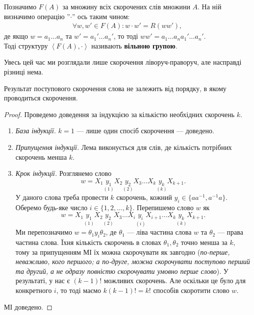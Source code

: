 \documentclass{math_library}
\begin{document}
\begin{definition}
Позначимо $F(A)$ за множину всіх скорочених слів множини $A$. На ній визначимо операцію ''$\cdot$'' ось таким чином:
\begin{align*}
\forall w,w' \in F(A): w \cdot w' = R(ww'),
\end{align*}
де якщо $w = a_1 \dots a_n$ та $w' = a_1' \dots a_n'$, то тоді $ww' = a_1 \dots a_n a_1' \dots a_n'$.\\
Тоді структуру $\left< F(A), \cdot \right>$ називають \textbf{вільною групою}.
\end{definition}

Увесь цей час ми розглядали лише скорочення ліворуч-праворуч, але насправді різниці нема.

\begin{lemma}
Результат поступового скорочення слова не залежить від порядку, в якому проводиться скорочення.
\end{lemma}

\begin{proof}
Проведемо доведення за індукцією за кількістю необхідних скорочень $k$.
\begin{enumerate}[nosep,wide=0pt,label={\Roman*.}]
\item \textit{База індукції.} $k = 1$ --- лише один спосіб скорочення --- доведено.
\item \textit{Припущення індукції.} Лема виконується для слів, де кількість потрібних скорочень менша $k$.
\item \textit{Крок індукції.} Розглянемо слово
\[ 
w = X_1 \underset{(1)}{y_1} X_2 \underset{(2)}{y_2} X_3 \dots X_{k} \underset{(k)}{y_k} X_{k+1}.
\]
У даного слова треба провести $k$ скорочень, кожний $y_i \in \{aa^{-1}, a^{-1}a\}$. Оберемо будь-яке число $i \in \{1,2,\dots,k\}$. Перепишемо слово $w$ як
\[ 
w = X_1 \underset{(1)}{y_1} X_2 \underset{(2)}{y_2} X_3 \dots X_{i} \underset{(i)}{y_i} X_{i+1} \dots X_{k} \underset{(k)}{y_k} X_{k+1}.
\]
Ми перепозначимо $w = \theta_1 y_i \theta_2$, де $\theta_1$ --- ліва частина слова $w$ та $\theta_2$ --- права частина слова. Їхня кількість скорочень в словах $\theta_1,\theta_2$ точно менша за $k$, тому за припущенням МІ їх можна скорочувати як завгодно (\textit{по-перше, неважливо, кого першого; а по-друге, можна скорочувати поступово перший та другий, а не одразу повністю скорочувати умовно перше слово}). У результаті, у нас є $(k-1)!$ можливих скорочень. Але оскільки це було для конкретного $i$, то тоді маємо $k(k-1)! = k!$ способів скоротити слово $w$.
\end{enumerate}
МІ доведено.  
\end{proof}
\end{document}
